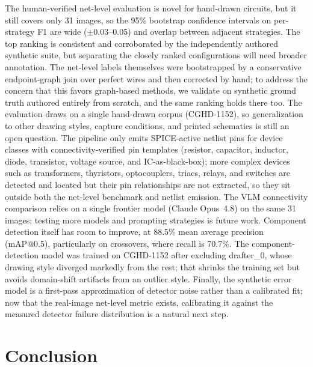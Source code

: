 \documentclass[journal]{IEEEtran}
\begin{document}
The human-verified net-level evaluation is novel for hand-drawn circuits, but it still covers only 31 images, so the 95\% bootstrap confidence intervals on per-strategy F1 are wide ($\pm$0.03--0.05) and overlap between adjacent strategies. The top ranking is consistent and corroborated by the independently authored synthetic suite, but separating the closely ranked configurations will need broader annotation. The net-level labels themselves were bootstrapped by a conservative endpoint-graph join over perfect wires and then corrected by hand; to address the concern that this favors graph-based methods, we validate on synthetic ground truth authored entirely from scratch, and the same ranking holds there too. The evaluation draws on a single hand-drawn corpus (CGHD-1152), so generalization to other drawing styles, capture conditions, and printed schematics is still an open question. The pipeline only emits SPICE-active netlist pins for device classes with connectivity-verified pin templates (resistor, capacitor, inductor, diode, transistor, voltage source, and IC-as-black-box); more complex devices such as transformers, thyristors, optocouplers, triacs, relays, and switches are detected and located but their pin relationships are not extracted, so they sit outside both the net-level benchmark and netlist emission. The VLM connectivity comparison relies on a single frontier model (Claude Opus~4.8) on the same 31 images; testing more models and prompting strategies is future work. Component detection itself has room to improve, at 88.5\% mean average precision (mAP@0.5), particularly on crossovers, where recall is 70.7\%. The component-detection model was trained on CGHD-1152 after excluding drafter\_0, whose drawing style diverged markedly from the rest; that shrinks the training set but avoids domain-shift artifacts from an outlier style. Finally, the synthetic error model is a first-pass approximation of detector noise rather than a calibrated fit; now that the real-image net-level metric exists, calibrating it against the measured detector failure distribution is a natural next step.

\section{Conclusion}
\end{document}
